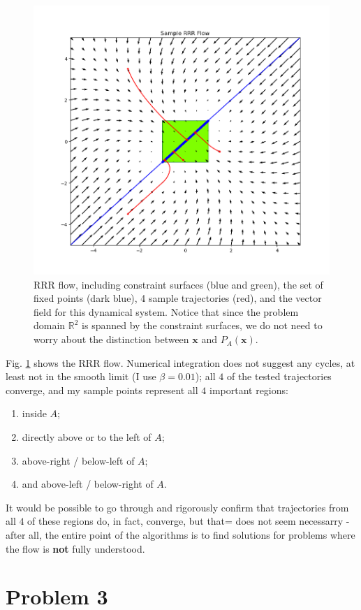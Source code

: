 \documentclass[psamsfonts]{amsart}
\theoremstyle{definition}
\theoremstyle{remark}
\numberwithin{equation}{section}
\begin{document}
\begin{figure}[H]
\centering
\includegraphics[width=\textwidth]{RRR_flow_final.png}
\caption{RRR flow, 
including constraint surfaces (blue and green), 
the set of fixed points (dark blue), 
4 sample trajectories (red), 
and the vector field for this dynamical system. 
Notice that since the problem domain $\mathbb{R}^2$ is spanned by the constraint surfaces, 
we do not need to worry about the distinction between $\mathbf{x}$ and $P_A(\mathbf{x})$.}
\label{fig2}
\end{figure}


Fig. \ref{fig2} shows the RRR flow. 
Numerical integration does not suggest any cycles, at least not in the smooth limit (I use $\beta = 0.01$); 
all $4$ of the tested trajectories converge, and my sample points represent all $4$ important regions:
\begin{enumerate}
\item
inside $A$; 
\item
directly above or to the left of $A$; 
\item
above-right /  below-left of $A$; 
\item
and above-left / below-right of $A$.
\end{enumerate}

It would be possible to go through and rigorously confirm that trajectories from all $4$ of these regions do, in fact, converge, 
but that= does not seem necessarry - after all, the entire point of the algorithms is to find solutions for problems where the 
flow is \textbf{not} fully understood.

\section{Problem 3}
\end{document}
